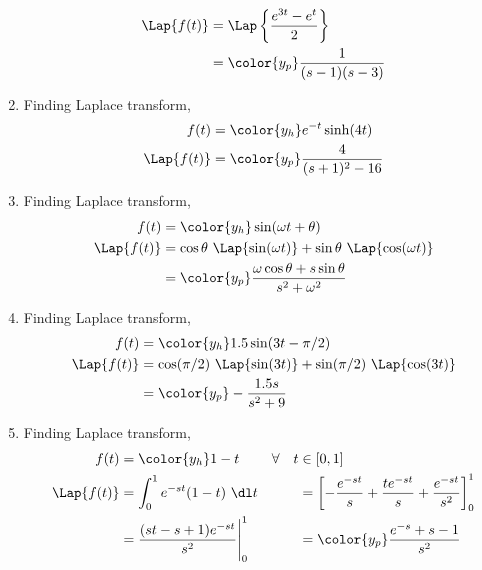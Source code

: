 \begin{enumerate}
\begin{align}
              \Lap\{f(t)\} & = \Lap\left\{ \frac{e^{3t} - e^{t}}{2} \right\} \\
                           & = \color{y_p}  \frac{1}{(s-1)(s-3)}
          \end{align}
    \item Finding Laplace transform,
          \begin{align}
              f(t)         & = \color{y_h} e^{-t}\sinh(4t)         \\
              \Lap\{f(t)\} & = \color{y_p}  \frac{4}{(s+1)^2 - 16}
          \end{align}
    \item Finding Laplace transform,
          \begin{align}
              f(t)         & = \color{y_h} \sin(\omega t + \theta)   \\
              \Lap\{f(t)\} & =  \cos\theta\ \Lap \{\sin(\omega t)\}
              + \sin\theta\ \Lap \{\cos(\omega t)\}                  \\
                           & = \color{y_p}  \frac{\omega \cos \theta
                  + s \sin \theta}{s^2 + \omega^2}
          \end{align}
    \item Finding Laplace transform,
          \begin{align}
              f(t)         & = \color{y_h} 1.5\sin(3 t - \pi/2)   \\
              \Lap\{f(t)\} & =  \cos(\pi/2)\ \Lap \{\sin(3 t)\}
              + \sin(\pi/2)\ \Lap \{\cos(3 t)\}                   \\
                           & = \color{y_p}  -\frac{1.5s}{s^2 + 9}
          \end{align}
    \item Finding Laplace transform,
          \begin{align}
              f(t)             & = \color{y_h} 1-t                            &
              \forall \quad  t & \in [0,1]                                      \\
              \Lap\{f(t)\}     & =  \int_{0}^{1} e^{-st}(1-t)\ \dl t          &
                               & = \left[ -\frac{e^{-st}}{s} +
              \frac{te^{-st}}{s} + \frac{e^{-st}}{s^2} \right]_0^1              \\
                               & = \frac{(st - s + 1)e^{-st}}{s^2} \Bigg|_0^1 &
                               & = \color{y_p}\frac{e^{-s} + s - 1}{s^2}
          \end{align}

\end{enumerate}

